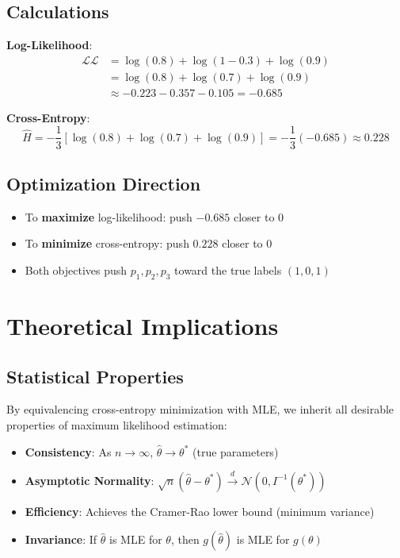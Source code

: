 \begin{notechapter}
\subsection{Calculations}

\textbf{Log-Likelihood}:
\begin{align*}
\mathcal{LL} &= \log(0.8) + \log(1-0.3) + \log(0.9) \\
&= \log(0.8) + \log(0.7) + \log(0.9) \\
&\approx -0.223 - 0.357 - 0.105 = -0.685
\end{align*}

\textbf{Cross-Entropy}:
\[
\hat{H} = -\frac{1}{3}[\log(0.8) + \log(0.7) + \log(0.9)] = -\frac{1}{3}(-0.685) \approx 0.228
\]

\subsection{Optimization Direction}
\begin{itemize}
    \item To \textbf{maximize} log-likelihood: push $-0.685$ closer to $0$
    \item To \textbf{minimize} cross-entropy: push $0.228$ closer to $0$
    \item Both objectives push $p_1, p_2, p_3$ toward the true labels $(1, 0, 1)$
\end{itemize}

\section{Theoretical Implications}

\subsection{Statistical Properties}

By equivalencing cross-entropy minimization with MLE, we inherit all desirable properties of maximum likelihood estimation:

\begin{itemize}
    \item \textbf{Consistency}: As $n \to \infty$, $\hat{\theta} \to \theta^*$ (true parameters)
    \item \textbf{Asymptotic Normality}: $\sqrt{n}(\hat{\theta} - \theta^*) \xrightarrow{d} \mathcal{N}(0, I^{-1}(\theta^*))$
    \item \textbf{Efficiency}: Achieves the Cramer-Rao lower bound (minimum variance)
    \item \textbf{Invariance}: If $\hat{\theta}$ is MLE for $\theta$, then $g(\hat{\theta})$ is MLE for $g(\theta)$
\end{itemize}


\end{notechapter}
